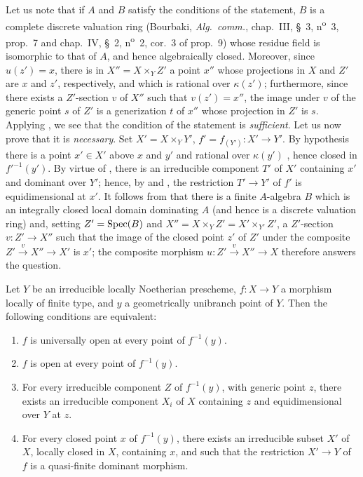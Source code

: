 Let us note that if $A$ and $B$ satisfy the conditions of the statement, $B$ is a complete discrete valuation ring (Bourbaki, \emph{Alg.\ comm.}, chap.~III, \S~3, n\textsuperscript{o}~3, prop.~7 and chap.~IV, \S~2, n\textsuperscript{o}~2, cor.~3 of prop.~9) whose residue field is isomorphic to that of $A$, and hence algebraically closed. Moreover, since $u(z')=x$, there is in $X''=X\times_Y Z'$ a point $x''$ whose projections in $X$ and $Z'$ are $x$ and $z'$, respectively, and which is rational over $\kappa(z')$; furthermore, since there exists a $Z'$-section $v$ of $X''$ such that $v(z')=x''$, the image under $v$ of the generic point $s$ of $Z'$ is a generization $t$ of $x''$ whose projection in $Z'$ is $s$. Applying , we see that the condition of the statement is \emph{sufficient}.
Let us now prove that it is \emph{necessary}.
Set $X'=X\times_Y Y'$, $f'=f_{(Y')}:X'\to Y'$.
By hypothesis there is a point $x'\in X'$ above $x$ and $y'$ and rational over $\kappa(y')$ , hence closed in $f'^{-1}(y')$.
By virtue of , there is an irreducible component $T'$ of $X'$ containing $x'$ and dominant over $Y'$; hence, by  and , the restriction $T'\to Y'$ of $f'$ is equidimensional at $x'$.
It follows from  that there is a finite $A$-algebra $B$ which is an integrally closed local domain dominating $A$ (and hence is a discrete valuation ring) and, setting $Z'=\operatorname{Spec}(B)$ and $X''=X\times_Y Z'=X'\times_{Y'}Z'$, a $Z'$-section $v:Z'\to X''$ such that the image of the closed point $z'$ of $Z'$ under the composite $Z'\xrightarrow{v}X''\to X'$ is $x'$; the composite morphism $u:Z'\xrightarrow{v}X''\to X$ therefore answers the question.

\begin{proposition}[14.5.9]
\label{IV.14.5.9}
Let $Y$ be an irreducible locally Noetherian prescheme, $f:X\to Y$ a morphism locally of finite type, and $y$ a geometrically unibranch point of $Y$.
Then the following conditions are equivalent:
\begin{enumerate}[label=\emph{\alph*)}]
  \item $f$ is universally open at every point of $f^{-1}(y)$.
  \item $f$ is open at every point of $f^{-1}(y)$.
  \item For every irreducible component $Z$ of $f^{-1}(y)$, with generic point $z$, there exists an irreducible component $X_i$ of $X$ containing $z$ and equidimensional over $Y$ at $z$.
  \item For every closed point $x$ of $f^{-1}(y)$, there exists an irreducible subset $X'$ of $X$, locally closed in $X$, containing $x$, and such that the restriction $X'\to Y$ of $f$ is a quasi-finite dominant morphism.
\end{enumerate}
\end{proposition}

